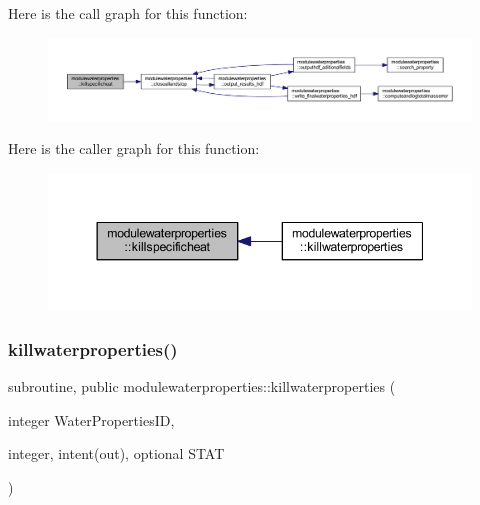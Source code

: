 Here is the call graph for this function\+:\nopagebreak
\begin{figure}[H]
\begin{center}
\leavevmode
\includegraphics[width=350pt]{namespacemodulewaterproperties_a801b2f175ad723ebc00e21ea2c6616cf_cgraph}
\end{center}
\end{figure}
Here is the caller graph for this function\+:\nopagebreak
\begin{figure}[H]
\begin{center}
\leavevmode
\includegraphics[width=344pt]{namespacemodulewaterproperties_a801b2f175ad723ebc00e21ea2c6616cf_icgraph}
\end{center}
\end{figure}
\mbox{\label{namespacemodulewaterproperties_a1b9de12d1335129516b68f6f80f85e49}} 
\subsubsection{\texorpdfstring{killwaterproperties()}{killwaterproperties()}}
{\footnotesize\ttfamily subroutine, public modulewaterproperties\+::killwaterproperties (\begin{DoxyParamCaption}\item[{integer}]{Water\+Properties\+ID,  }\item[{integer, intent(out), optional}]{S\+T\+AT }\end{DoxyParamCaption})}

